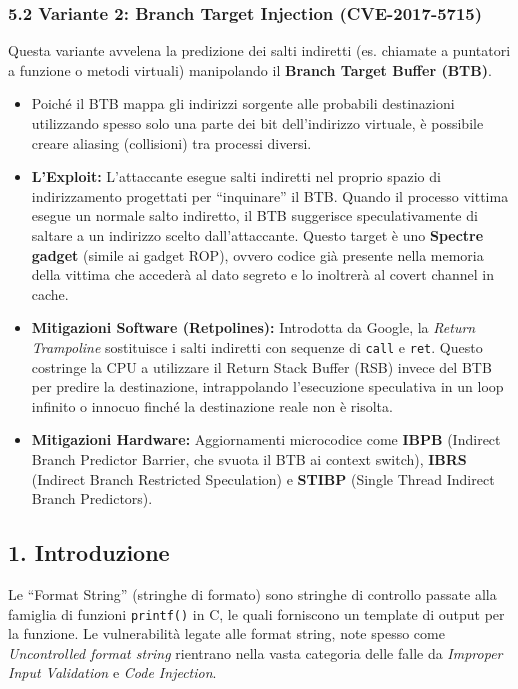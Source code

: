 \documentclass{article}
\begin{document}
\subsubsection{5.2 Variante 2: Branch Target Injection (CVE-2017-5715)}
Questa variante avvelena la predizione dei salti indiretti (es. chiamate a puntatori a funzione o metodi virtuali) manipolando il \textbf{Branch Target Buffer (BTB)}.
\begin{itemize}
    \item Poiché il BTB mappa gli indirizzi sorgente alle probabili destinazioni utilizzando spesso solo una parte dei bit dell'indirizzo virtuale, è possibile creare aliasing (collisioni) tra processi diversi.
    \item \textbf{L'Exploit:} L'attaccante esegue salti indiretti nel proprio spazio di indirizzamento progettati per ``inquinare'' il BTB. Quando il processo vittima esegue un normale salto indiretto, il BTB suggerisce speculativamente di saltare a un indirizzo scelto dall'attaccante. Questo target è uno \textbf{Spectre gadget} (simile ai gadget ROP), ovvero codice già presente nella memoria della vittima che accederà al dato segreto e lo inoltrerà al covert channel in cache.
    \item \textbf{Mitigazioni Software (Retpolines):} Introdotta da Google, la \emph{Return Trampoline} sostituisce i salti indiretti con sequenze di \texttt{call} e \texttt{ret}. Questo costringe la CPU a utilizzare il Return Stack Buffer (RSB) invece del BTB per predire la destinazione, intrappolando l'esecuzione speculativa in un loop infinito o innocuo finché la destinazione reale non è risolta.
    \item \textbf{Mitigazioni Hardware:} Aggiornamenti microcodice come \textbf{IBPB} (Indirect Branch Predictor Barrier, che svuota il BTB ai context switch), \textbf{IBRS} (Indirect Branch Restricted Speculation) e \textbf{STIBP} (Single Thread Indirect Branch Predictors).
\end{itemize}

\subsection{1. Introduzione}
Le ``Format String'' (stringhe di formato) sono stringhe di controllo passate alla famiglia di funzioni \texttt{printf()} in C, le quali forniscono un template di output per la funzione. 
Le vulnerabilità legate alle format string, note spesso come \emph{Uncontrolled format string} rientrano nella vasta categoria delle falle da \emph{Improper Input Validation} e \emph{Code Injection}.
\end{document}
